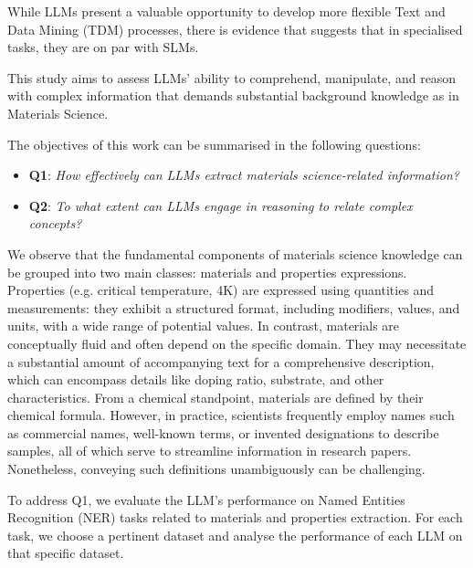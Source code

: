 \documentclass[a4paper]{article}
\begin{document}
While LLMs present a valuable opportunity to develop more flexible Text and Data Mining (TDM) processes, there is evidence that suggests that in specialised tasks, they are on par with SLMs. 

This study aims to assess LLMs' ability to comprehend, manipulate, and reason with complex information that demands substantial background knowledge as in Materials Science. 

The objectives of this work can be summarised in the following questions: 
\begin{itemize}
    \item \textbf{Q1}: \textit{How effectively can LLMs extract materials science-related information?}
    \item \textbf{Q2}: \textit{To what extent can LLMs engage in reasoning to relate complex concepts?}
\end{itemize}

We observe that the fundamental components of materials science knowledge can be grouped into two main classes: materials and properties expressions. 
Properties (e.g. critical temperature, 4K) are expressed using quantities and measurements: they exhibit a structured format, including modifiers, values, and units, with a wide range of potential values. 
In contrast, materials are conceptually fluid and often depend on the specific domain. They may necessitate a substantial amount of accompanying text for a comprehensive description, which can encompass details like doping ratio, substrate, and other characteristics. 
From a chemical standpoint, materials are defined by their chemical formula. 
However, in practice, scientists frequently employ names such as commercial names, well-known terms, or invented designations to describe samples, all of which serve to streamline information in research papers. Nonetheless, conveying such definitions unambiguously can be challenging.


To address Q1, we evaluate the LLM's performance on Named Entities Recognition (NER) tasks related to materials and properties extraction.
For each task, we choose a pertinent dataset and analyse the performance of each LLM on that specific dataset.

\end{document}
